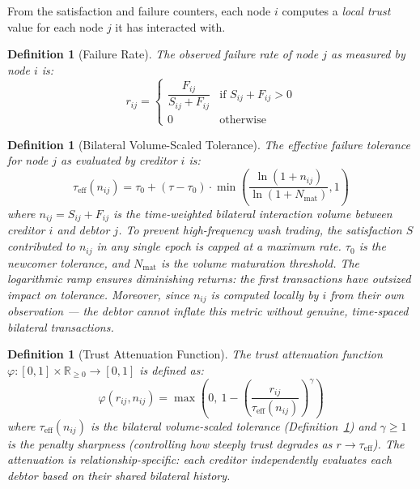 \documentclass[11pt]{article}
\newtheorem{definition}[theorem]{Definition}
\begin{document}
From the satisfaction and failure counters, each node $i$ computes a \emph{local trust} value for each node $j$ it has interacted with.

\begin{definition}[Failure Rate]\label{def:failure_rate}
The observed failure rate of node $j$ as measured by node $i$ is:
\begin{equation}
    r_{ij} = \begin{cases}
        \dfrac{F_{ij}}{S_{ij} + F_{ij}} & \text{if } S_{ij} + F_{ij} > 0 \\[8pt]
        0 & \text{otherwise}
    \end{cases}
\end{equation}
\end{definition}

\begin{definition}[Bilateral Volume-Scaled Tolerance]\label{def:volume_tolerance}
The effective failure tolerance for node $j$ as evaluated by creditor $i$ is:
\begin{equation}\label{eq:volume_tolerance}
    \tau_{\text{eff}}(n_{ij}) = \tau_0 + (\tau - \tau_0) \cdot \min\!\left(\frac{\ln(1 + n_{ij})}{\ln(1 + N_{\text{mat}})}, 1\right)
\end{equation}
where $n_{ij} = S_{ij} + F_{ij}$ is the \emph{time-weighted} bilateral interaction volume between creditor $i$ and debtor $j$. To prevent high-frequency wash trading, the satisfaction $S$ contributed to $n_{ij}$ in any single epoch is capped at a maximum rate. $\tau_0$ is the newcomer tolerance, and $N_{\text{mat}}$ is the volume maturation threshold. The logarithmic ramp ensures diminishing returns: the first transactions have outsized impact on tolerance. Moreover, since $n_{ij}$ is computed locally by $i$ from their own observation --- the debtor cannot inflate this metric without genuine, time-spaced bilateral transactions.
\end{definition}

\begin{definition}[Trust Attenuation Function]\label{def:attenuation}
The trust attenuation function $\varphi: [0,1] \times \mathbb{R}_{\geq 0} \to [0,1]$ is defined as:
\begin{equation}\label{eq:attenuation}
    \varphi(r_{ij}, n_{ij}) = \max\!\left(0,\ 1 - \left(\frac{r_{ij}}{\tau_{\text{eff}}(n_{ij})}\right)^{\!\gamma}\right)
\end{equation}
where $\tau_{\text{eff}}(n_{ij})$ is the bilateral volume-scaled tolerance (Definition~\ref{def:volume_tolerance}) and $\gamma \geq 1$ is the \emph{penalty sharpness} (controlling how steeply trust degrades as $r \to \tau_{\text{eff}}$). The attenuation is relationship-specific: each creditor independently evaluates each debtor based on their shared bilateral history.
\end{definition}
\end{document}
